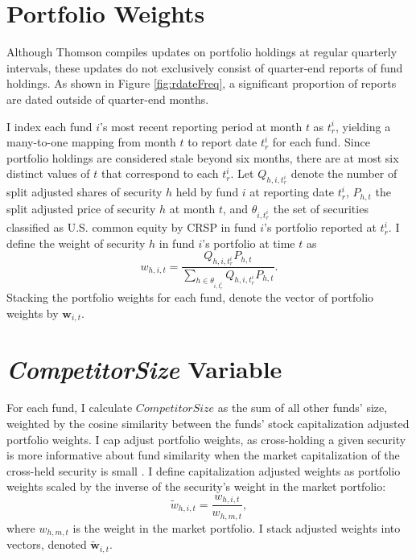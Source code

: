 \documentclass[openany]{book}
\theoremstyle{definition}
\theoremstyle{definition}
\theoremstyle{definition}
\theoremstyle{remark}
\begin{document}
\hypertarget{sec:portfolioWeights}{%
\section{Portfolio Weights}\label{sec:portfolioWeights}}

Although Thomson compiles updates on portfolio holdings at regular
quarterly intervals, these updates do not exclusively consist of
quarter-end reports of fund holdings. As shown in Figure
\ref{fig:rdateFreq}, a significant proportion of reports are dated
outside of quarter-end months.

I index each fund \(i\)'s most recent reporting period at month \(t\) as
\(t^i_r\), yielding a many-to-one mapping from month \(t\) to report
date \(t^i_r\) for each fund. Since portfolio holdings are considered
stale beyond six months, there are at most six distinct values of \(t\)
that correspond to each \(t^i_r\). Let \(Q_{h,i,t^i_r}\) denote the
number of split adjusted shares of security \(h\) held by fund \(i\) at
reporting date \(t^i_r\), \(P_{h,t}\) the split adjusted price of
security \(h\) at month \(t\), and \(\theta_{i,t^i_r}\) the set of
securities classified as U.S. common equity by CRSP in fund \(i\)'s
portfolio reported at \(t^i_r\). I define the weight of security \(h\)
in fund \(i\)'s portfolio at time \(t\) as \begin{equation}
w_{h,i,t} = \frac{Q_{h,i,t^i_r} P_{h,t} }{\sum_{h\in\theta_{i,t^i_r}} Q_{h,i,t^i_r} P_{h,t} }.
\end{equation} Stacking the portfolio weights for each fund, denote the
vector of portfolio weights by \(\mathbf{w}_{i,t}\).

\hypertarget{sec:CompetitorSize}{%
\section{\texorpdfstring{\emph{CompetitorSize}
Variable}{CompetitorSize Variable}}\label{sec:CompetitorSize}}

For each fund, I calculate \(CompetitorSize\) as the sum of all other
funds' size, weighted by the cosine similarity between the funds' stock
capitalization adjusted portfolio weights. I cap adjust portfolio
weights, as cross-holding a given security is more informative about
fund similarity when the market capitalization of the cross-held
security is small \citep{ccp05}. I define capitalization adjusted
weights as portfolio weights scaled by the inverse of the security's
weight in the market portfolio: \begin{equation}
\tilde{w}_{h,i,t} = \frac{w_{h,i,t}}{w_{h,m,t}},
\end{equation} where \(w_{h,m,t}\) is the weight in the market
portfolio. I stack adjusted weights into vectors, denoted
\(\mathbf{\tilde{w}}_{i,t}\).
\end{document}
